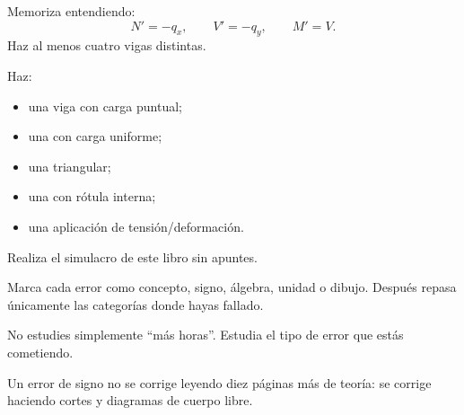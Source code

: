 Memoriza entendiendo:
\[
N'=-q_x,\qquad V'=-q_y,\qquad M'=V.
\]
Haz al menos cuatro vigas distintas.

Haz:
\begin{itemize}
  \item una viga con carga puntual;
  \item una con carga uniforme;
  \item una triangular;
  \item una con rótula interna;
  \item una aplicación de tensión/deformación.
\end{itemize}

Realiza el simulacro de este libro sin apuntes.

Marca cada error como concepto, signo, álgebra, unidad o dibujo. Después repasa únicamente las categorías donde hayas fallado.

\begin{tip}
No estudies simplemente ``más horas''. Estudia el tipo de error que estás cometiendo.

Un error de signo no se corrige leyendo diez páginas más de teoría: se corrige haciendo cortes y diagramas de cuerpo libre.
\end{tip}


